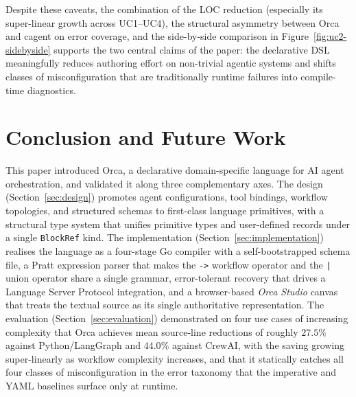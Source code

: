 \documentclass[sigconf,nonacm]{acmart}
\begin{document}
Despite these caveats, the combination of the LOC reduction (especially
its super-linear growth across UC1--UC4), the structural asymmetry
between Orca and cagent on error coverage, and the side-by-side
comparison in Figure~\ref{fig:uc2-sidebyside} supports the two central
claims of the paper: the declarative DSL meaningfully reduces authoring
effort on non-trivial agentic systems and shifts classes of
misconfiguration that are traditionally runtime failures into compile-time
diagnostics.

\section{Conclusion and Future Work}
\label{sec:conclusion}

This paper introduced Orca, a declarative domain-specific language for AI
agent orchestration, and validated it along three complementary axes. The
design (Section~\ref{sec:design}) promotes agent configurations, tool
bindings, workflow topologies, and structured schemas to first-class
language primitives, with a structural type system that unifies primitive
types and user-defined records under a single \texttt{BlockRef} kind. The
implementation (Section~\ref{sec:implementation}) realises the language as
a four-stage Go compiler with a self-bootstrapped schema file, a Pratt
expression parser that makes the \texttt{->} workflow operator and the
\texttt{|} union operator share a single grammar, error-tolerant recovery
that drives a Language Server Protocol integration, and a browser-based
\emph{Orca Studio} canvas that treats the textual source as its single
authoritative representation. The evaluation
(Section~\ref{sec:evaluation}) demonstrated on four use cases of
increasing complexity that Orca achieves mean source-line reductions of
roughly $27.5\%$ against Python/LangGraph and $44.0\%$ against CrewAI,
with the saving growing super-linearly as workflow complexity increases,
and that it statically catches all four classes of misconfiguration in
the error taxonomy that the imperative and YAML baselines surface only at
runtime.
\end{document}

